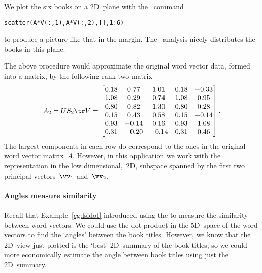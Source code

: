 \begin{enumerate}
{}
We plot the six books on a 2D~plane with the \script\ command
\begin{verbatim}
scatter(A*V(:,1),A*V(:,2),[],1:6)
\end{verbatim}
to produce a picture like that in the margin.
The \svd\ analysis nicely distributes the books in this plane.
\end{enumerate}

The above procedure would approximate the original word vector data, formed into a matrix, by the following rank two matrix \twodp
\begin{equation*}
A_2=US_2\tr V
=\begin{bmatrix} 0.18&0.77&1.01&0.18&-0.33
\\1.08&0.29&0.74&1.08&0.95
\\0.80&0.82&1.30&0.80&0.28
\\0.15&0.43&0.58&0.15&-0.14
\\0.93&-0.14&0.16&0.93&1.08
\\0.31&-0.20&-0.14&0.31&0.46 \end{bmatrix}.
\end{equation*}
The largest components in each row do correspond to the ones in the original word vector matrix~\(A\).
However, in this application we work with the representation in the low dimensional,~2D, subspace spanned by the first two principal vectors~\(\vv_1\) and~\(\vv_2\).


\paragraph{Angles measure similarity}
Recall that Example~\ref{eg:lsidot} introduced using the  to measure the similarity between word vectors.
We could use the dot product in the 5D~space of the word vectors to find the `angles' between the book titles.
However, we know that the 2D~view just plotted is the `best' 2D~summary of the book titles, so we could more economically estimate the angle between book titles using just the 2D~summary.


